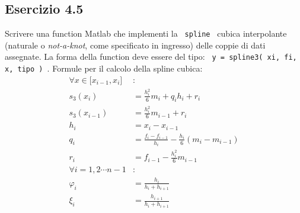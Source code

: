 	\subsection {Esercizio 4.5}
	
Scrivere una function Matlab che implementi la \texttt { spline } cubica interpolante (naturale o \textit{not-a-knot}, come specificato in ingresso) delle coppie di dati assegnate. La forma della function deve essere del tipo: \texttt { y = spline3( xi, fi, x, tipo ) }.
\PP
Formule per il calcolo della spline cubica:
\begin{equation*}
	\begin{split}
		\forall x \in \lbrack x_{i-1}, x_i \rbrack & : \\
		s_3(x_i) & = \frac{h_i^2}{6}m_i + q_i h_i +r_i \\
		s_3(x_{i-1}) & = \frac{h_i^2}{6}m_{i-1} + r_i \\
		h_i & = x_i - x_{i-1} \\
		q_i & = \frac{f_i - f_{i-1}}{h_i} - \frac{h_i}{6}(m_i -m_{i-1})\\ 
		r_i &= f_{i-1}  - \frac{h_i^2}{6}m_{i-1} \\
		\forall i = 1, 2 \cdots n-1 & : \\
		\varphi_i & = \frac{h_i}{h_i+h_{i+1}} \\
		\xi_i & = \frac{h_{i+1}}{h_i+h_{i+1}} 
	\end{split}
\end{equation*}

